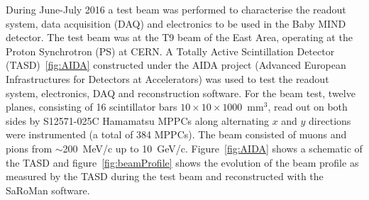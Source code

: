 During June-July 2016 a test beam was performed to characterise the readout system, data acquisition (DAQ) and electronics to be used in the Baby MIND detector. The test beam was at the T9 beam of the East Area, operating at the Proton Synchrotron (PS) at CERN. A Totally Active Scintillation Detector (TASD)~\ref{fig:AIDA} constructed under the AIDA project (Advanced European Infrastructures for Detectors at Accelerators) was used to test the readout system, electronics, DAQ and reconstruction software. For the beam test, twelve planes, consisting of 16 scintillator bars $10\times 10\times 1000$~mm$^3$, read out on both sides by S12571-025C Hamamatsu MPPCs  along alternating $x$ and $y$ directions were instrumented (a total of 384 MPPCs). The beam consisted of muons and pions from $\sim$200~MeV/c up to 10~GeV/c. Figure~\ref{fig:AIDA} shows a schematic of the TASD and figure~\ref{fig:beamProfile} shows the evolution of the beam profile as measured by the TASD during the test beam and reconstructed with the SaRoMan software. 


